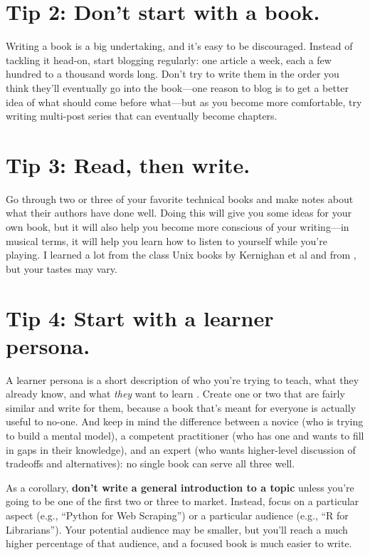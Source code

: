 \documentclass[10pt,letterpaper]{article}
\begin{document}
\section*{Tip 2: Don't start with a book.}

Writing a book is a big undertaking, and it's easy to be discouraged.
Instead of tackling it head-on,
start blogging regularly:
one article a week, each a few hundred to a thousand words long.
Don't try to write them in the order you think they'll eventually go into the book—one reason to blog
is to get a better idea of what should come before what—but
as you become more comfortable,
try writing multi-post series that can eventually become chapters.

\section*{Tip 3: Read, then write.}

Go through two or three of your favorite technical books
and make notes about what their authors have done well.
Doing this will give you some ideas for your own book,
but it will also help you become more conscious of your writing—in musical terms,
it will help you learn how to listen to yourself while you're playing.
I learned a lot from the class Unix books by Kernighan et al
\cite{Ke1979, Ke1981, Ke1983, Ke1988} and from \cite{Ud1999},
but your tastes may vary.

\section*{Tip 4: Start with a learner persona.}

A learner persona is a short description of who you're trying to teach,
what they already know,
and what \emph{they} want to learn \cite{Wi2019}.
Create one or two that are fairly similar and write for them,
because a book that's meant for everyone is actually useful to no-one.
And keep in mind the difference between a novice (who is trying to build a mental model),
a competent practitioner (who has one and wants to fill in gaps in their knowledge),
and an expert (who wants higher-level discussion of tradeoffs and alternatives):
no single book can serve all three well.

As a corollary,
\textbf{don't write a general introduction to a topic}
unless you're going to be one of the first two or three to market.
Instead,
focus on a particular aspect (e.g., ``Python for Web Scraping'')
or a particular audience (e.g., ``R for Librarians'').
Your potential audience may be smaller,
but you'll reach a much higher percentage of that audience,
and a focused book is much easier to write.
\end{document}
